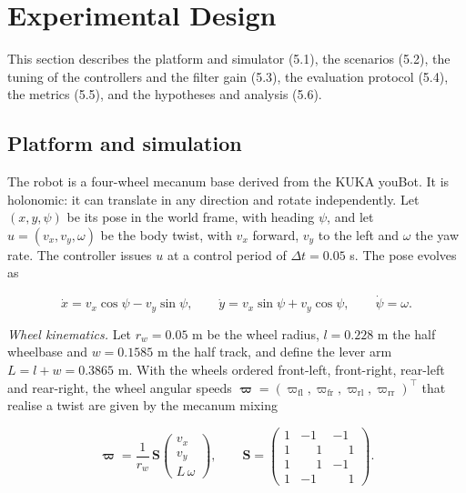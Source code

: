 \section{Experimental Design}

This section describes the platform and simulator (5.1), the scenarios (5.2), the tuning of the controllers and the filter gain (5.3), the evaluation protocol (5.4), the metrics (5.5), and the hypotheses and analysis (5.6).

\subsection{Platform and simulation}

The robot is a four-wheel mecanum base derived from the KUKA youBot. It is holonomic: it can translate in any direction and rotate independently. Let $(x, y, \psi)$ be its pose in the world frame, with heading $\psi$, and let $u = (v_x, v_y, \omega)$ be the body twist, with $v_x$ forward, $v_y$ to the left and $\omega$ the yaw rate. The controller issues $u$ at a control period of $\Delta t = 0.05$ s. The pose evolves as

\begin{equation*}
\dot x = v_x \cos\psi - v_y \sin\psi, \qquad
\dot y = v_x \sin\psi + v_y \cos\psi, \qquad
\dot\psi = \omega .
\tag{9}
\end{equation*}

\emph{Wheel kinematics.} Let $r_w = 0.05$ m be the wheel radius, $l = 0.228$ m the half wheelbase and $w = 0.1585$ m the half track, and define the lever arm $L = l + w = 0.3865$ m. With the wheels ordered front-left, front-right, rear-left and rear-right, the wheel angular speeds $\boldsymbol{\varpi} = (\varpi_{\mathrm{fl}}, \varpi_{\mathrm{fr}}, \varpi_{\mathrm{rl}}, \varpi_{\mathrm{rr}})^{\top}$ that realise a twist are given by the mecanum mixing

\begin{equation*}
\boldsymbol{\varpi} = \frac{1}{r_w}\, \mathbf{S}
\begin{pmatrix} v_x \\ v_y \\ L\,\omega \end{pmatrix}, \qquad
\mathbf{S} =
\begin{pmatrix}
1 & -1 & -1 \\
1 & \phantom{-}1 & \phantom{-}1 \\
1 & \phantom{-}1 & -1 \\
1 & -1 & \phantom{-}1
\end{pmatrix}.
\tag{10}
\end{equation*}

